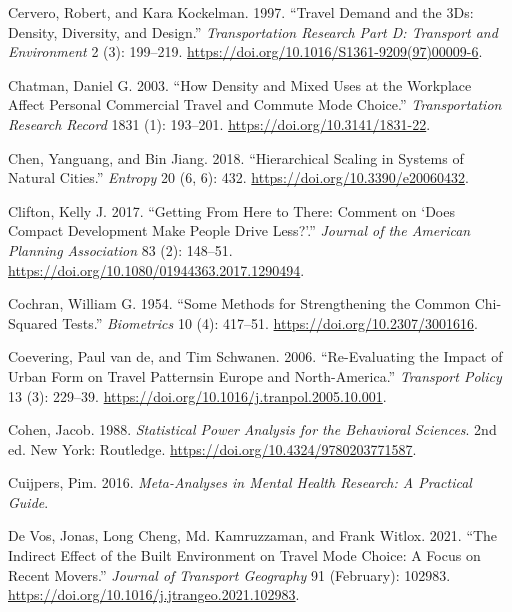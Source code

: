 \documentclass[
  11pt,
  openany]{memoir}
\newlength{\cslhangindent}
\newlength{\cslentryspacingunit} %
\newenvironment{CSLReferences}[2] %
 {%
  \setlength{\parindent}{0pt}
  \ifodd #1
  \let\oldpar\par
  \def\par{\hangindent=\cslhangindent\oldpar}
  \fi
  \setlength{\parskip}{#2\cslentryspacingunit}
 }%
 {}
\begin{document}
\begin{CSLReferences}{1}{0}
\leavevmode{}%
Cervero, Robert, and Kara Kockelman. 1997. {``Travel Demand and the {3Ds}: Density, Diversity, and Design.''} \emph{Transportation Research Part D: Transport and Environment} 2 (3): 199--219. \url{https://doi.org/10.1016/S1361-9209(97)00009-6}.

\leavevmode{}%
Chatman, Daniel G. 2003. {``How {Density} and {Mixed Uses} at the {Workplace Affect Personal Commercial Travel} and {Commute Mode Choice}.''} \emph{Transportation Research Record} 1831 (1): 193--201. \url{https://doi.org/10.3141/1831-22}.

\leavevmode{}%
Chen, Yanguang, and Bin Jiang. 2018. {``Hierarchical {Scaling} in {Systems} of {Natural Cities}.''} \emph{Entropy} 20 (6, 6): 432. \url{https://doi.org/10.3390/e20060432}.

\leavevmode{}%
Clifton, Kelly J. 2017. {``Getting {From Here} to {There}: Comment on {`{Does Compact Development Make People Drive Less}?'}.''} \emph{Journal of the American Planning Association} 83 (2): 148--51. \url{https://doi.org/10.1080/01944363.2017.1290494}.

\leavevmode{}%
Cochran, William G. 1954. {``Some {Methods} for {Strengthening} the {Common} Chi-Squared {Tests}.''} \emph{Biometrics} 10 (4): 417--51. \url{https://doi.org/10.2307/3001616}.

\leavevmode{}%
Coevering, Paul van de, and Tim Schwanen. 2006. {``Re-Evaluating the Impact of Urban Form on Travel Patternsin {Europe} and {North}-{America}.''} \emph{Transport Policy} 13 (3): 229--39. \url{https://doi.org/10.1016/j.tranpol.2005.10.001}.

\leavevmode{}%
Cohen, Jacob. 1988. \emph{Statistical {Power Analysis} for the {Behavioral Sciences}}. 2nd ed. {New York}: {Routledge}. \url{https://doi.org/10.4324/9780203771587}.

\leavevmode{}%
Cuijpers, Pim. 2016. \emph{Meta-Analyses in Mental Health Research: A Practical Guide}.

\leavevmode{}%
De Vos, Jonas, Long Cheng, Md. Kamruzzaman, and Frank Witlox. 2021. {``The Indirect Effect of the Built Environment on Travel Mode Choice: A Focus on Recent Movers.''} \emph{Journal of Transport Geography} 91 (February): 102983. \url{https://doi.org/10.1016/j.jtrangeo.2021.102983}.


\end{CSLReferences}
\end{document}
